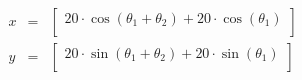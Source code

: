 \begin{eqnarray}
x&=&\begin{bmatrix}
20\cdot \cos(\theta_1 + \theta_2) + 20\cdot \cos(\theta_1)\\ 
\end{bmatrix} \\
y&=&\begin{bmatrix}
20\cdot \sin(\theta_1 + \theta_2) + 20\cdot \sin(\theta_1)\\ 
\end{bmatrix} 
\end{eqnarray}
